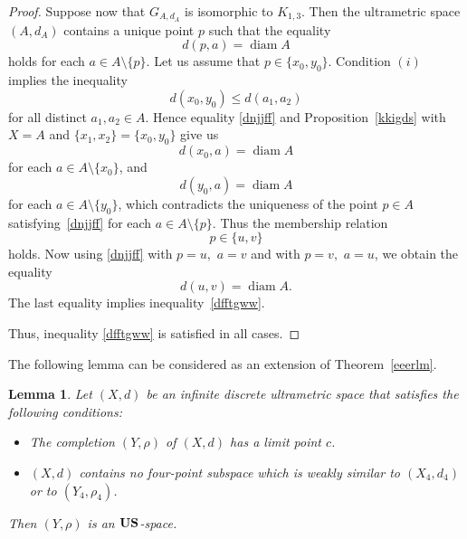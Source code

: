 \documentclass[11pt]{article}
\newtheorem{lemma}[theorem]{Lemma}
\theoremstyle{definition}
\theoremstyle{remark}
\numberwithin{equation}{section}
\begin{document}
\begin{proof}
Suppose now that $G_{A,d_A}$ is isomorphic to $K_{1,3}$. Then the ultrametric space $(A,d_A)$ contains 
 a unique point $ p$  such that the equality
\begin{equation}
    \label{dnjjff}
d(p,a) = \operatorname{diam}A 
\end{equation}
holds for each $ a \in A \setminus \{p\}.$ Let us assume that $p\in \{x_0,y_0\}$.
Condition $(i)$ implies the inequality
\[
d(x_0,y_0) \leq d(a_1,a_2)
\]
 for all distinct \(a_1,a_2 \in A\).
 Hence equality \eqref{dnjjff} and Proposition~\ref{kkigds} with \(X = A\) and \(\{x_1, x_2 \}= \{x_0,y_0\}\) give us 
\[
d(x_0,a) = \operatorname{diam}A
\]
for each $ a \in A \setminus \{x_0\}$,
and
\[
d(y_0,a) = \operatorname{diam}A 
\]
for each $ a \in A \setminus \{y_0\}$,
which contradicts the uniqueness of the point \(p \in A \) satisfying~\eqref{dnjjff} for each \(a \in A\setminus \{p\} \).
Thus the membership relation
\[
p \in \{u,v\}
\]
holds. Now using \eqref{dnjjff} with \(p=u,\) \( a=v\) and with \(p=v, \) \(a=u\), we obtain the equality
\[
d(u,v) = \operatorname{diam}A.
\]
The last equality implies inequality~\eqref{dfftgww}.  

Thus, inequality \eqref{dfftgww} is satisfied in all cases.


\end{proof}


The following lemma can be considered as an extension of Theorem~\ref{eeerlm}.




\begin{lemma}\label{gfjhkg}
Let $(X,d)$ be an infinite discrete ultrametric space that satisfies the following conditions:
\begin{itemize}[left=10pt]
\item[(i)] The completion $(Y,\rho)$ of  $(X,d)$ has a limit point $c$.



    \item[(ii)] $(X,d)$ contains no four-point subspace which is weakly similar to $(X_4,d_4)$ or to $(Y_4,\rho_4)$.
\end{itemize}


Then $(Y,\rho)$ is an ${\bf US}$-space.
\end{lemma}
\end{document}
